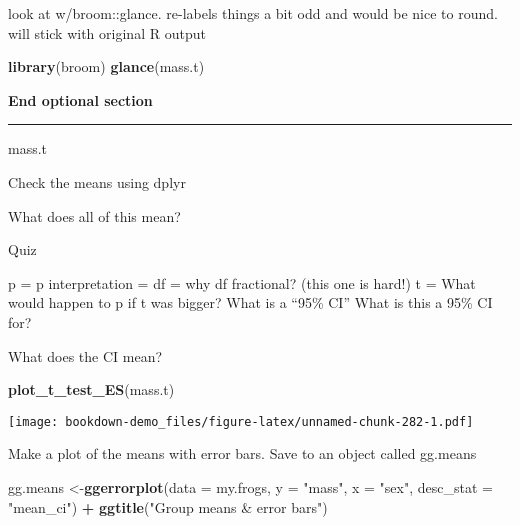 \documentclass[]{book}
\newenvironment{Shaded}{\begin{snugshade}}{\end{snugshade}}
\newcommand{\KeywordTok}[1]{\textcolor[rgb]{0.13,0.29,0.53}{\textbf{#1}}}
\newcommand{\DataTypeTok}[1]{\textcolor[rgb]{0.13,0.29,0.53}{#1}}
\newcommand{\StringTok}[1]{\textcolor[rgb]{0.31,0.60,0.02}{#1}}
\newcommand{\OperatorTok}[1]{\textcolor[rgb]{0.81,0.36,0.00}{\textbf{#1}}}
\newcommand{\NormalTok}[1]{#1}
\theoremstyle{definition}
\theoremstyle{definition}
\theoremstyle{definition}
\theoremstyle{remark}
\begin{document}
look at w/broom::glance. re-labels things a bit odd and would be nice to
round. will stick with original R output

\begin{Shaded}
\begin{Highlighting}[]
\KeywordTok{library}\NormalTok{(broom)}
\KeywordTok{glance}\NormalTok{(mass.t)}
\end{Highlighting}
\end{Shaded}

\textbf{End optional section}

\begin{center}\rule{0.5\linewidth}{\linethickness}\end{center}

\begin{Shaded}
\begin{Highlighting}[]
\NormalTok{mass.t}
\end{Highlighting}
\end{Shaded}

Check the means using dplyr

\begin{Shaded}
\end{Shaded}

What does all of this mean?

Quiz

p = p interpretation = df = why df fractional? (this one is hard!) t =
What would happen to p if t was bigger? What is a ``95\% CI'' What is
this a 95\% CI for?

What does the CI mean?

\begin{Shaded}
\begin{Highlighting}[]
\KeywordTok{plot_t_test_ES}\NormalTok{(mass.t)}
\end{Highlighting}
\end{Shaded}

\texttt{[image: bookdown-demo\_files/figure-latex/unnamed-chunk-282-1.pdf]}

Make a plot of the means with error bars. Save to an object called
gg.means

\begin{Shaded}
\begin{Highlighting}[]
\NormalTok{gg.means <-}\KeywordTok{ggerrorplot}\NormalTok{(}\DataTypeTok{data =}\NormalTok{ my.frogs,}
          \DataTypeTok{y =} \StringTok{"mass"}\NormalTok{,}
          \DataTypeTok{x =} \StringTok{"sex"}\NormalTok{,}
          \DataTypeTok{desc_stat =} \StringTok{"mean_ci"}\NormalTok{) }\OperatorTok{+}
\StringTok{  }\KeywordTok{ggtitle}\NormalTok{(}\StringTok{"Group means & error bars"}\NormalTok{)}
\end{Highlighting}
\end{Shaded}
\end{document}
